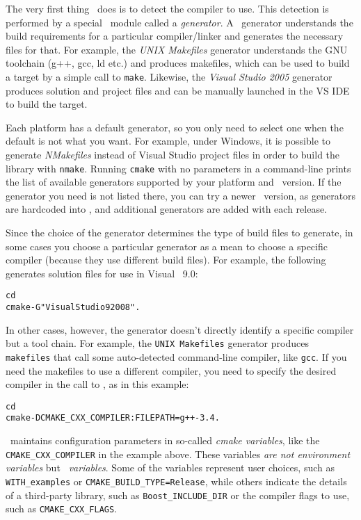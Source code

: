 The very first thing \cmake\ does is to detect the compiler to use.  This
detection is performed by a special \cmake\ module called a
\emph{generator}. 
A \cmake\ generator understands the build requirements for a
particular compiler/linker and generates the necessary files for that. For
example, the \emph{UNIX Makefiles} generator understands the GNU toolchain
(g++, gcc, ld etc.) and produces makefiles, which can be used to build a
target by a simple call to \texttt{make}.  Likewise, the \emph{Visual Studio
  2005} generator produces solution and project files and can be manually
launched in the VS IDE to build the target.

Each platform has a default generator, so you only need to select one when
the default is not what you want.  For example, under Windows, it is
possible to generate \emph{NMakefiles} instead of Visual Studio project
files in order to build the library with \texttt{nmake}.  Running
\texttt{cmake} with no parameters in a command-line prints the list of
available generators supported by your platform and \cmake\ version. If the
generator you need is not listed there, you can try a newer 
\cmake\ version, as generators are hardcoded into \cmake, and additional
generators are added with each release.

Since the choice of the generator determines the type of build files to generate, in some cases
you choose a particular generator as a mean to choose a specific compiler (because they use different 
build files). For example, the following generates solution files for use in Visual \CC\ 9.0:

{\ccTexHtml{}{}
\begin{alltt}
  cd \cgalrel
  cmake -G"Visual Studio 9 2008" . 
\end{alltt}
}

In other cases, however, the generator doesn't directly identify a specific compiler but a tool chain.
For example, the \texttt{UNIX Makefiles} generator produces \texttt{makefiles} that call some auto-detected
command-line compiler, like \texttt{gcc}. If you need the makefiles to use a different compiler, you need to
specify the desired compiler in the call to \cmake{}, as in this example:

{\ccTexHtml{}{}
\begin{alltt}
  cd \cgalrel
  cmake -DCMAKE_CXX_COMPILER:FILEPATH=g++-3.4 . 
\end{alltt}
}

\cmake\ maintains configuration parameters in so-called \emph{cmake variables}, like the \texttt{CMAKE\_CXX\_COMPILER}
in the example above. These variables \emph{are not environment variables} but \emph{\cmake\ variables}. Some of the \cmake{} 
variables represent user choices, such as \texttt{WITH\_examples} or \texttt{CMAKE\_BUILD\_TYPE=Release}, while others
indicate the details of a third-party library, such as \texttt{Boost\_INCLUDE\_DIR} or the compiler flags to use,
such as \texttt{CMAKE\_CXX\_FLAGS}. 

